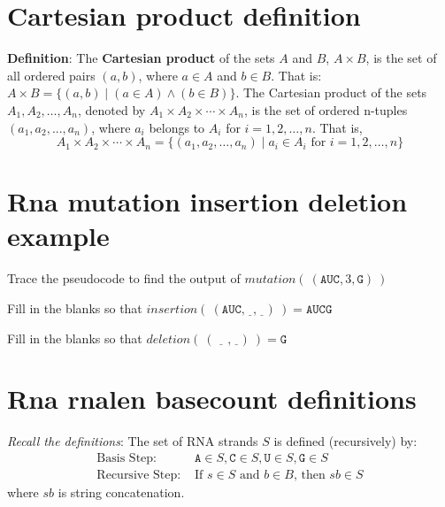 \documentclass[12pt, oneside]{article}
\newcommand{\A}[0]{\texttt{A}}
\newcommand{\C}[0]{\texttt{C}}
\newcommand{\G}[0]{\texttt{G}}
\newcommand{\U}[0]{\texttt{U}}
\begin{document}
\begin{flushright}
\end{flushright} \section*{Cartesian product definition}


{\bf Definition}: The {\bf Cartesian product} of the sets $A$ and $B$, 
$A \times B$, is the set of all ordered pairs $(a, b)$, where $a \in A$ and $b \in B$. 
That is: $A \times B = \{(a, b) \mid (a \in A) \land (b \in B)\}$.
The Cartesian product of the sets $A_1, A_2, \ldots ,A_n$, denoted by 
$A_1 \times A_2 \times \cdots \times A_n$, is the
set of ordered n-tuples $(a_1, a_2,...,a_n)$, where $a_i$ belongs to 
$A_i$ for $i = 1, 2,\ldots,n$. That is,
\[
    A_1 \times A_2 \times \cdots \times A_n = \{(a_1, a_2,\ldots,a_n) \mid a_i \in A_i \textrm{ for } i = 1, 2,\ldots,n\}
\] \vfill
\section*{Rna mutation insertion deletion example}


Trace the pseudocode to find the output of $\textit{mutation}(~ (\A\U\C, 3, \G) ~)$

\vspace{50pt}

Fill in the blanks so that $\textit{insertion}(~(\A\U\C, \underline{\phantom{3}}, \underline{\phantom{\G}})~) = \A\U\C\G$

\vspace{50pt}

Fill in the blanks so that $\textit{deletion}(~(\underline{\phantom{\G\G}}, \underline{\phantom{1}})~) =  \G$

\vspace{50pt}
 \vfill
\section*{Rna rnalen basecount definitions}


{\it Recall the definitions}: The set of RNA strands $S$ is defined (recursively) by:
\[
\begin{array}{ll}
\textrm{Basis Step: } & \A \in S, \C \in S, \U \in S, \G \in S \\
\textrm{Recursive Step: } & \textrm{If } s \in S\textrm{ and }b \in B \textrm{, then }sb \in S
\end{array}
\]
where $sb$ is string concatenation.
\end{document}
